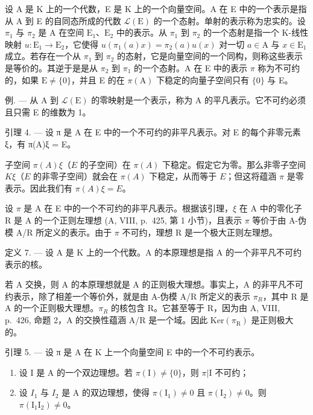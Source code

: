 设 A 是 K 上的一个代数，E 是 K 上的一个向量空间。A 在 E 中的一个表示是指从 A 到 E 的自同态所成的代数 \(\mathcal{L}(\mathrm{E})\) 的一个态射。单射的表示称为忠实的。设 \(\pi_1\) 与 \(\pi_2\) 是 A 在空间 \(\mathrm{E}_1\)、\(\mathrm{E}_2\) 中的表示。从 \(\pi_1\) 到 \(\pi_2\) 的一个态射是指一个 K-线性映射 \(u: \mathrm{E}_1 \to \mathrm{E}_2\)，它使得 \(u(\pi_1(a)x) = \pi_2(a)u(x)\) 对一切 \(a \in \mathrm{A}\) 与 \(x \in \mathrm{E}_1\) 成立。若存在一个从 \(\pi_1\) 到 \(\pi_2\) 的态射，它是向量空间的一个同构，则称这些表示是等价的。其逆于是是从 \(\pi_2\) 到 \(\pi_1\) 的一个态射。A 在 E 中的表示 \(\pi\) 称为不可约的，如果 \(\mathrm{E} \neq \{0\}\)，并且 E 的在 \(\pi(\mathrm{A})\) 下稳定的向量子空间只有 \(\{0\}\) 与 E。

例. --- 从 A 到 \(\mathcal{L}(\mathrm{E})\) 的零映射是一个表示，称为 A 的平凡表示。它不可约必须且只需 E 的维数为 1。

引理 4. --- 设 π 是 A 在 E 中的一个不可约的非平凡表示。对 E 的每个非零元素 ξ，有 π(A)ξ = E。

子空间 \(\pi(A)\xi\)（\(E\) 的子空间）在 \(\pi(A)\) 下稳定。假定它为零。那么非零子空间 \(K\xi\)（\(E\) 的非零子空间）就会在 \(\pi(A)\) 下稳定，从而等于 \(E\)；但这将蕴涵 \(\pi\) 是零表示。因此我们有 \(\pi(A)\xi = E\)。

设 \(\pi\) 是 A 在 E 中的一个不可约的非平凡表示。根据该引理，\(\xi\) 在 A 中的零化子 R 是 A 的一个正则左理想 (A, VIII, p.~425, 第 1 小节)，且表示 \(\pi\) 等价于由 A-伪模 A/R 所定义的表示。由于 \(\pi\) 不可约，理想 R 是一个极大正则左理想。

定义 7. --- 设 A 是 K 上的一个代数。A 的本原理想是指 A 的一个非平凡不可约表示的核。

若 A 交换，则 A 的本原理想就是 A 的正则极大理想。事实上，A 的非平凡不可约表示，除了相差一个等价外，就是由 A-伪模 A/R 所定义的表示 \(\pi_{R}\)，其中 R 是 A 的一个正则极大理想。\(\pi_{R}\) 的核包含 R。它甚至等于 R，因为由 A, VIII, p.~426, 命题 2，A 的交换性蕴涵 A/R 是一个域。因此 \(\text{Ker}(\pi_{\text{R}})\) 是正则极大的。

引理 5. --- 设 π 是 A 在 K 上一个向量空间 E 中的一个不可约表示。

\begin{enumerate}
\def\labelenumi{\alph{enumi})}
\item
  设 I 是 A 的一个双边理想。若 \(\pi(\mathrm{I}) \neq \{0\}\)，则 \(\pi|\mathrm{I}\) 不可约；
\item
  设 \(I_{1}\) 与 \(I_{2}\) 是 A 的双边理想，使得 \(\pi(\mathrm{I}_{1}) \neq 0\) 且 \(\pi(\mathrm{I}_{2}) \neq 0\)。则 \(\pi(\mathrm{I}_{1}\mathrm{I}_{2}) \neq 0\)。
\end{enumerate}

